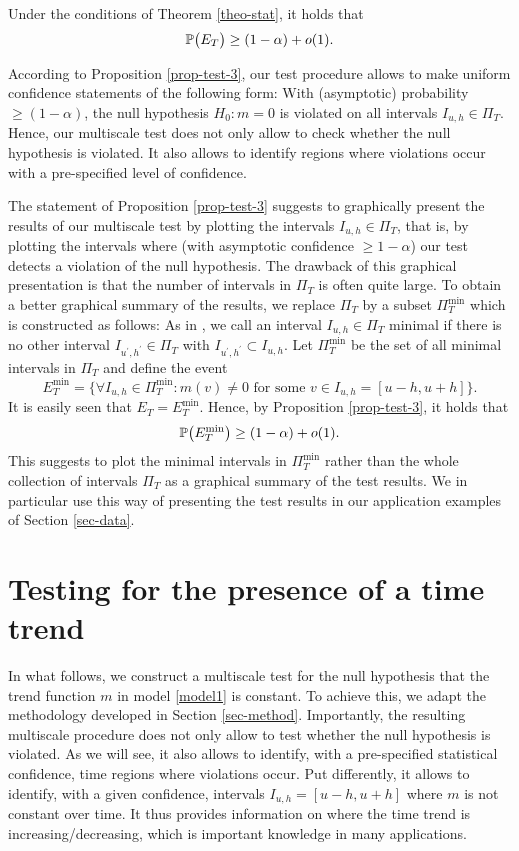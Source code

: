 \begin{prop}\label{prop-test-3}
Under the conditions of Theorem \ref{theo-stat}, it holds that  
\[ \mathbb{P} \big( E_T \big) \ge (1-\alpha) + o(1). \] 
\end{prop}
According to Proposition \ref{prop-test-3}, our test procedure allows to make uniform confidence statements of the following form: With (asymptotic) probability $\ge (1-\alpha)$, the null hypothesis $H_0: m = 0$ is violated on all intervals $I_{u,h} \in \Pi_T$. Hence, our multiscale test does not only allow to check whether the null hypothesis is violated. It also allows to identify regions where violations occur with a pre-specified level of confidence. 
 

The statement of Proposition \ref{prop-test-3} suggests to graphically present the results of our multiscale test by plotting the intervals $I_{u,h} \in \Pi_T$, that is, by plotting the intervals where (with asymptotic confidence $\ge 1-\alpha$) our test detects a violation of the null hypothesis. The drawback of this graphical presentation is that the number of intervals in $\Pi_T$ is often quite large. To obtain a better graphical summary of the results, we replace $\Pi_T$ by a subset $\Pi_T^{\min}$ which is constructed as follows: As in \cite{Duembgen2002}, we call an interval $I_{u,h} \in \Pi_T$ minimal if there is no other interval $I_{u^\prime,h^\prime} \in \Pi_T$ with $I_{u^\prime,h^\prime} \subset I_{u,h}$. Let $\Pi_T^{\min}$ be the set of all minimal intervals in $\Pi_T$ and define the event 
\[ E_T^{\min} = \Big\{ \forall I_{u,h} \in \Pi_T^{\min}: m(v) \ne 0 \text{ for some } v \in I_{u,h} = [u-h,u+h] \Big\}. \]
It is easily seen that $E_T = E_T^{\min}$. Hence, by Proposition \ref{prop-test-3}, it holds that 
\[ \mathbb{P} \big(E_T^{\min}\big) \ge (1-\alpha) + o(1). \] 
This suggests to plot the minimal intervals in $\Pi_T^{\min}$ rather than the whole collection of intervals $\Pi_T$ as a graphical summary of the test results. We in particular use this way of presenting the test results in our application examples of Section \ref{sec-data}. 



\section{Testing for the presence of a time trend}\label{sec-test-shape}


In what follows, we construct a multiscale test for the null hypothesis that the trend function $m$ in model \eqref{model1} is constant. To achieve this, we adapt the methodology developed in Section \ref{sec-method}. Importantly, the resulting multiscale procedure does not only allow to test whether the null hypothesis is violated. As we will see, it also allows to identify, with a pre-specified statistical confidence, time regions where violations occur. Put differently, it allows to identify, with a given confidence, intervals $I_{u,h} = [u-h,u+h]$ where $m$ is not constant over time.
It thus provides information on where the time trend is increasing/decreasing, which is important knowledge in many applications. 


